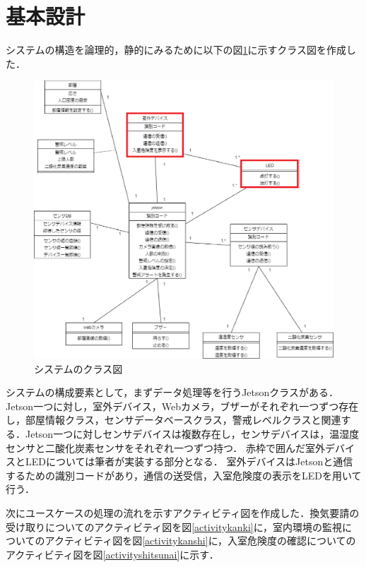 
\section{基本設計}

システムの構造を論理的，静的にみるために以下の図\ref{class}に示すクラス図を作成した．

\begin{figure}[htbp]
\centering
\includegraphics[width=15cm]{./uml/class_e.eps}
\caption{システムのクラス図}
\label{class}
\end{figure}

システムの構成要素として，まずデータ処理等を行うJetsonクラスがある．Jetson一つに対し，室外デバイス，Webカメラ，ブザーがそれぞれ一つずつ存在し，部屋情報クラス，センサデータベースクラス，警戒レベルクラスと関連する．Jetson一つに対しセンサデバイスは複数存在し，センサデバイスは，温湿度センサと二酸化炭素センサをそれぞれ一つずつ持つ．
赤枠で囲んだ室外デバイスとLEDについては筆者が実装する部分となる．
室外デバイスはJetsonと通信するための識別コードがあり，通信の送受信，入室危険度の表示をLEDを用いて行う．

次にユースケースの処理の流れを示すアクティビティ図を作成した．換気要請の受け取りについてのアクティビティ図を図\ref{activitykanki}に，室内環境の監視についてのアクティビティ図を図\ref{activitykanshi}に，入室危険度の確認についてのアクティビティ図を図\ref{activityshitsunai}に示す．

